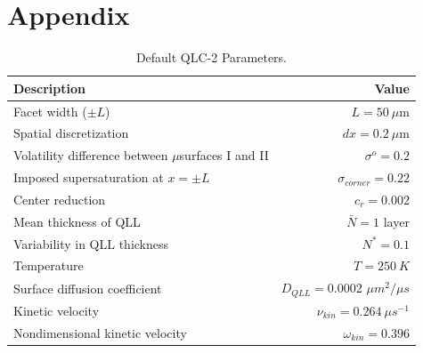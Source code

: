 \documentclass[draft]{agujournal2019}
\begin{document}
\section{Appendix}

\begin{table}[H]
    \caption{Default QLC-2 Parameters.}
    \begin{tabular}{lr}
    \hline 
    Description & Value\\
    \hline 
    Facet width ($\pm L$)  & $L = 50 \ \mu$m \\
    Spatial discretization & $dx=0.2 \ \mu$m \\
    Volatility difference between $\mu$surfaces I and II & $\sigma^o=0.2$ \\
    Imposed supersaturation at $x=\pm L$ & $\sigma_{corner}=0.22$ \\
    Center reduction & $c_r = 0.002 $ \\
    Mean thickness of QLL & $\bar{N}=1$ layer \\
    Variability in QLL thickness & $N^*=0.1$ \\
    Temperature & $T = 250 \ K$ \\
    Surface diffusion coefficient & $D_{QLL} = 0.0002$ $\mu m^2/\mu s$ \\
    Kinetic velocity & $\nu_{kin}=0.264 \ \mu s^{-1}$ \\
    Nondimensional kinetic velocity & $\omega_{kin}=0.396$ \\
    \hline
    \end{tabular}
    \label{table: QLC-2 parameters}
\end{table}
\end{document}
